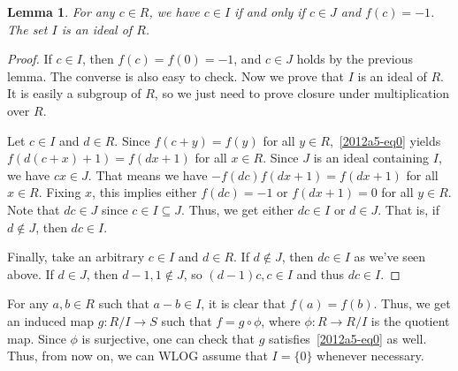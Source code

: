 \documentclass{article}
\newtheorem{lemma}{Lemma}
\begin{document}
\begin{lemma}\label{2012a5-2-2}
For any $c \in R$, we have $c \in I$ if and only if $c \in J$ and $f(c) = -1$.
The set $I$ is an ideal of $R$.
\end{lemma}
\begin{proof}
If $c \in I$, then $f(c) = f(0) = -1$, and $c \in J$ holds by the previous lemma.
The converse is also easy to check.
Now we prove that $I$ is an ideal of $R$.
It is easily a subgroup of $R$, so we just need to prove closure under multiplication over $R$.

Let $c \in I$ and $d \in R$.
Since $f(c + y) = f(y)$ for all $y \in R$,~\eqref{2012a5-eq0} yields $f(d(c + x) + 1) = f(dx + 1)$ for all $x \in R$.
Since $J$ is an ideal containing $I$, we have $cx \in J$.
That means we have $-f(dc) f(dx + 1) = f(dx + 1)$ for all $x \in R$.
Fixing $x$, this implies either $f(dc) = -1$ or $f(dx + 1) = 0$ for all $y \in R$.
Note that $dc \in J$ since $c \in I \subseteq J$.
Thus, we get either $dc \in I$ or $d \in J$.
That is, if $d \notin J$, then $dc \in I$.

Finally, take an arbitrary $c \in I$ and $d \in R$.
If $d \notin J$, then $dc \in I$ as we've seen above.
If $d \in J$, then $d - 1, 1 \notin J$, so $(d - 1)c, c \in I$ and thus $dc \in I$.
\end{proof}

For any $a, b \in R$ such that $a - b \in I$, it is clear that $f(a) = f(b)$.
Thus, we get an induced map $g : R/I \to S$ such that $f = g \circ \phi$, where $\phi : R \to R/I$ is the quotient map.
Since $\phi$ is surjective, one can check that $g$ satisfies~\eqref{2012a5-eq0} as well.
Thus, from now on, we can WLOG assume that $I = \{0\}$ whenever necessary.
\end{document}
